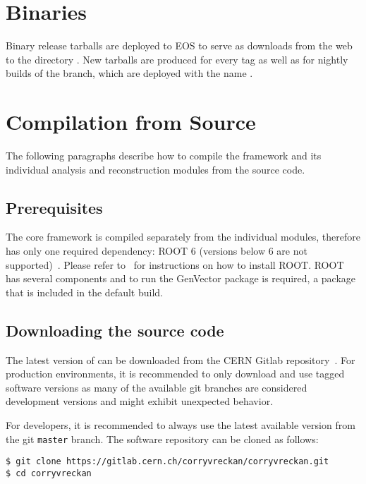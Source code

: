 \section{Binaries}

Binary release tarballs are deployed to EOS to serve as downloads from the web to the directory .
New tarballs are produced for every tag as well as for nightly builds of the  branch, which are deployed with the name .


\section{Compilation from Source}

The following paragraphs describe how to compile the \corry framework and its individual analysis and reconstruction modules from the source code.

\subsection{Prerequisites}
\label{sec:prerequisites}
The core framework is compiled separately from the individual modules, therefore \corry has only one required dependency: ROOT 6 (versions below 6 are not supported)~\cite{root}.
Please refer to~\cite{rootinstallation} for instructions on how to install ROOT.
ROOT has several components and to run \corry the GenVector package is required, a package that is included in the default build.

\subsection{Downloading the source code}
The latest version of \corry can be downloaded from the CERN Gitlab repository~\cite{corry-repo}.
For production environments, it is recommended to only download and use tagged software versions as many of the available git branches are considered development versions and might exhibit unexpected behavior.

For developers, it is recommended to always use the latest available version from the git \texttt{master} branch.
The software repository can be cloned as follows:

\begin{verbatim}
$ git clone https://gitlab.cern.ch/corryvreckan/corryvreckan.git
$ cd corryvreckan
\end{verbatim}

